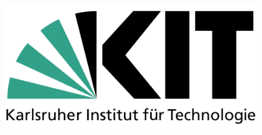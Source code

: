 \documentclass[a4paper, 11pt, headsepline,footsepline,twoside,abstract]{scrbook}
\begin{document}
\thispagestyle{empty}
\begin{center}
\end{center}

\begin{figure}
	\centering
	\includegraphics[width=0.5\columnwidth]{images/KIT_LOGO.png}
	\label{img:grafik-dummy}
\end{figure}
\end{document}
